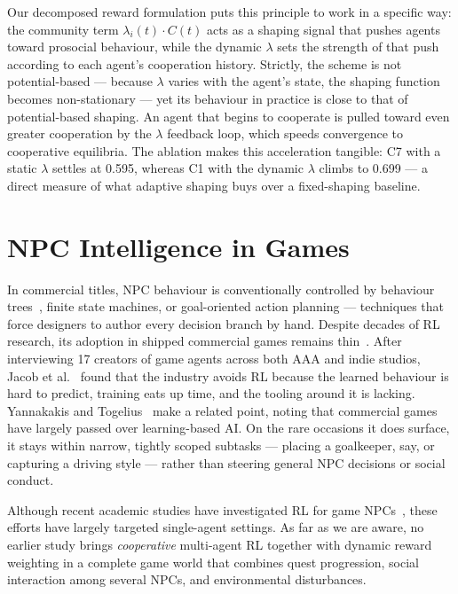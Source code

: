 \documentclass[12pt, a4paper, oneside]{report}
\begin{document}
Our decomposed reward formulation puts this principle to work in a specific way: the community term $\lambda_i(t) \cdot C(t)$ acts as a shaping signal that pushes agents toward prosocial behaviour, while the dynamic $\lambda$ sets the strength of that push according to each agent's cooperation history. Strictly, the scheme is not potential-based --- because $\lambda$ varies with the agent's state, the shaping function becomes non-stationary --- yet its behaviour in practice is close to that of potential-based shaping. An agent that begins to cooperate is pulled toward even greater cooperation by the $\lambda$ feedback loop, which speeds convergence to cooperative equilibria. The ablation makes this acceleration tangible: C7 with a static $\lambda$ settles at 0.595, whereas C1 with the dynamic $\lambda$ climbs to 0.699 --- a direct measure of what adaptive shaping buys over a fixed-shaping baseline.

\section{NPC Intelligence in Games}
\label{sec:npc-intelligence}

In commercial titles, NPC behaviour is conventionally controlled by behaviour trees~\cite{isla2005bt}, finite state machines, or goal-oriented action planning --- techniques that force designers to author every decision branch by hand. Despite decades of RL research, its adoption in shipped commercial games remains thin~\cite{liu2025schola}. After interviewing 17 creators of game agents across both AAA and indie studios, Jacob et al.~\cite{jacob2020unwieldy} found that the industry avoids RL because the learned behaviour is hard to predict, training eats up time, and the tooling around it is lacking. Yannakakis and Togelius~\cite{yannakakis2018gameai} make a related point, noting that commercial games have largely passed over learning-based AI. On the rare occasions it does surface, it stays within narrow, tightly scoped subtasks --- placing a goalkeeper, say, or capturing a driving style --- rather than steering general NPC decisions or social conduct.

Although recent academic studies have investigated RL for game NPCs~\cite{riedl2012interactive}, these efforts have largely targeted single-agent settings. As far as we are aware, no earlier study brings \textit{cooperative} multi-agent RL together with dynamic reward weighting in a complete game world that combines quest progression, social interaction among several NPCs, and environmental disturbances.
\end{document}
